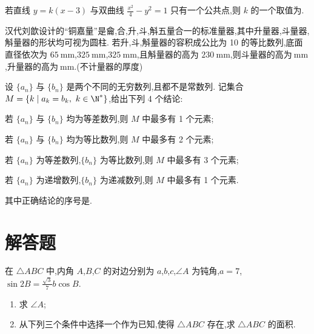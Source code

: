\begin{problem}
若直线 \(y=k(x-3)\) 与双曲线 \(\frac{x^2}{4}-y^2=1\) 只有一个公共点,则 \(k\) 的一个取值为\fillinblank{}.
\end{problem}

\begin{problem}
汉代刘歆设计的``铜嘉量''是龠,合,升,斗,斛五量合一的标准量器,其中升量器,斗量器,斛量器的形状均可视为圆柱. 若升,斗,斛量器的容积成公比为 10 的等比数列,底面直径依次为 \(65\mathrm{~mm}\),\(325\mathrm{~mm}\),\(325\mathrm{~mm}\),且斛量器的高为 \(230\mathrm{~mm}\),则斗量器的高为\fillinblank{}\(\mathrm{~mm}\),升量器的高为\fillinblank{}\(\mathrm{~mm}\).(不计量器的厚度)
\end{problem}

\begin{problem}
设 \(\{a_n\}\) 与 \(\{b_n\}\) 是两个不同的无穷数列,且都不是常数列. 记集合 \(M=\{k\mid a_k=b_k,\ k\in \N^*\}\),给出下列 4 个结论:

\begin{circlelist}
\item 若 \(\{a_n\}\) 与 \(\{b_n\}\) 均为等差数列,则 \(M\) 中最多有 1 个元素;
\item 若 \(\{a_n\}\) 与 \(\{b_n\}\) 均为等比数列,则 \(M\) 中最多有 2 个元素;
\item 若 \(\{a_n\}\) 为等差数列,\(\{b_n\}\) 为等比数列,则 \(M\) 中最多有 3 个元素;
\item 若 \(\{a_n\}\) 为递增数列,\(\{b_n\}\) 为递减数列,则 \(M\) 中最多有 1 个元素.
\end{circlelist}

其中正确结论的序号是\fillinblank{}.
\end{problem}

\section{解答题}

\begin{problem}
在 \(\triangle ABC\) 中,内角 \(A\),\(B\),\(C\) 的对边分别为 \(a\),\(b\),\(c\),\(\angle A\) 为钝角,\(a=7\),\(\sin 2B=\frac{\sqrt{3}}{7}b\cos B\).

\begin{enumerate}
\item 求 \(\angle A\);
\item 从下列三个条件中选择一个作为已知,使得 \(\triangle ABC\) 存在,求 \(\triangle ABC\) 的面积.
\end{enumerate}
\end{problem}

